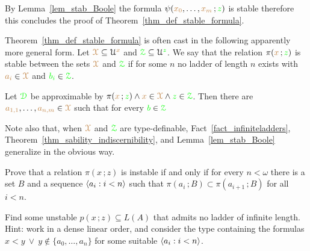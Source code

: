 


By Lemma~\ref{lem_stab_Boole} the formula $\psi({\color{brown} x_0},\dots,{\color{brown} x_m}\,;{\color{green} z})$ is stable therefore this concludes the proof of Theorem~\ref{thm_def_stable_formula}.

\begin{remark}\label{rem_sability_no_compactness}
  Theorem~\ref{thm_def_stable_formula} is often cast in the following  apparently more general form.
  Let ${\color{brown}\EuScript X}\subseteq\EuScript U^{\color{brown} x}$ and ${\color{green}\EuScript Z}\subseteq\EuScript U^{\color{green} z}$.
  We say that the relation $\pi({\color{brown} x}\,;{\color{green} z})$ is stable between the sets ${\color{brown}\EuScript X}$ and ${\color{green}\EuScript Z}$ if for some $n$ no ladder of length $n$ exists with ${\color{brown} a_i}\in{\color{brown}\EuScript X}$ and ${\color{green} b_i}\in{\color{green}\EuScript Z}$.

  Let ${\color{green}\EuScript D}$ be approximable by $\pi({\color{brown} x}\,;{\color{green} z})\wedge {\color{brown}x}\in{\color{brown}\EuScript X}\wedge {\color{green}z}\in{\color{green}\EuScript Z}$.
  Then there are ${\color{brown} a_{1,1}},\dots,{\color{brown} a_{n,m}}\in {\color{brown}\EuScript X}$ such that for every ${\color{green} b}\in{\color{green}\EuScript Z}$


  Note also that, when ${\color{brown}\EuScript X}$ and ${\color{green}\EuScript Z}$ are type-definable, Fact~\ref{fact_infiniteladders}, Theorem~\ref{thm_sability_indiscernibility}, and Lemma~\ref{lem_stab_Boole} generalize in the obvious way.
\end{remark} 

\bigskip
\begin{exercise}
  Prove that a relation $\pi(x\,;z)$ is instable if and only if for every $n<\omega$ there is a set $B$ and a sequence $\langle a_i:i<n\rangle$ such that $\pi(a_i\,;B)\subset\pi(a_{i+1}\,;B)$ for all $i<n$.
\end{exercise}

\begin{exercise}
  Find some unstable $p(x\,;z)\subseteq L(A)$ that admits no ladder of infinite length. 
  Hint: work in a dense linear order, and consider the type containing the formulas $x<y\ \vee\  y\notin\{a_0,\dots,a_n\}$ for some suitable $\langle a_i:i<n\rangle$.
\end{exercise}

